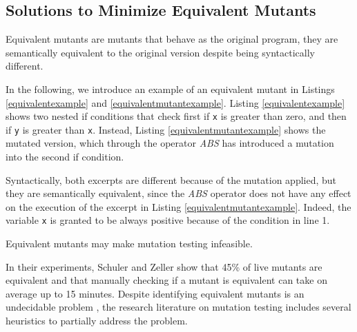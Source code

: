 
\subsection{Solutions to Minimize Equivalent Mutants}
\label{sec:opt:equivalent}

Equivalent mutants are mutants that behave as the original program, they are semantically equivalent to the original version despite being syntactically different. 

In the following, we introduce an example of an equivalent mutant in Listings \ref{equivalentexample} and \ref{equivalentmutantexample}. Listing \ref{equivalentexample} shows two nested if conditions that check first if \texttt{x} is greater than zero, and then if \texttt{y} is greater than \texttt{x}. Instead, Listing \ref{equivalentmutantexample} shows the mutated version, which through the operator \textit{ABS} has introduced a mutation into the second if condition.



Syntactically, both excerpts are different because of the mutation applied, but they are semantically equivalent, since the \textit{ABS} operator does not have any effect on the execution of the excerpt in Listing \ref{equivalentmutantexample}. Indeed, the variable \texttt{x} is granted to be always positive because of the condition in line 1.

Equivalent mutants may make mutation testing infeasible.  

In their experiments, Schuler and Zeller \cite{schuler2013covering} show that 45\% of live mutants are equivalent and that manually checking if a mutant is equivalent can take on average up to 15 minutes. 
 Despite identifying equivalent mutants is an undecidable problem \cite{madeyski2013overcoming}, the research literature on mutation testing includes several heuristics to partially address the problem. 


